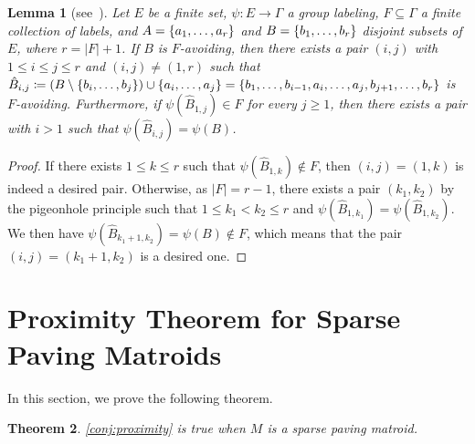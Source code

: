 \documentclass{article}
\DeclarePairedDelimiter{\set}{\{}{\}}
\newtheorem{theorem}{Theorem}[section]
\newtheorem{lemma}[theorem]{Lemma}
\theoremstyle{definition}
\begin{document}
\begin{lemma}[see~\cite{horsch2024problems_arxiv}]\label{lem:pigeon}
    Let $E$ be a finite set, $\psi\colon E\to \Gamma$ a group labeling, $F\subseteq \Gamma$ a finite collection of labels, and $A=\set{a_1,\dots, a_r}$ and $B=\set{b_1,\dots, b_r}$ disjoint subsets of $E$, where $r=|F|+1$.
    If $B$ is $F$-avoiding, then there exists a pair $(i,j)$ with $1 \le i \le j \le r$ and $(i,j) \ne (1,r)$ such that $\hat{B}_{i,j}\coloneqq (B \setminus \set{b_i, \dotsc, b_j}) \cup \set{a_i, \dotsc, a_j} = \set{b_1,\dotsc, b_{i-1}, a_{i},\dotsc, a_j, b_{j+1},\dotsc, b_r}$ is $F$-avoiding.
    Furthermore, if $\psi(\hat{B}_{1,j}) \in F$ for every $j \ge 1$, then there exists a pair with $i > 1$ such that $\psi(\hat{B}_{i,j}) = \psi(B)$.
\end{lemma}
\begin{proof}
If there exists $1 \le k \le r$ such that $\psi(\hat{B}_{1,k}) \notin F$, then $(i, j) = (1, k)$ is indeed a desired pair.
Otherwise, as $|F| = r-1$, there exists a pair $(k_1, k_2)$ by the pigeonhole principle such that $1 \le k_1 < k_2 \le r$ and $\psi(\hat{B}_{1,k_1}) = \psi(\hat{B}_{1,k_2})$.
We then have $\psi(\hat{B}_{k_1+1,k_2}) = \psi(B) \notin F$, which means that the pair $(i, j) = (k_1 + 1, k_2)$ is a desired one.
\end{proof}


\section{Proximity Theorem for Sparse Paving Matroids}\label{sec:sparse-paving}
In this section, we prove the following theorem.

\begin{theorem}\label{thm:proximity-sparse-paving}
    \cref{conj:proximity} is true when $M$ is a sparse paving matroid.
\end{theorem}
\end{document}
